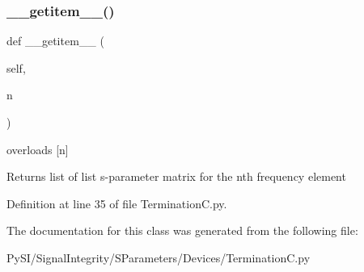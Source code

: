\subsubsection{\texorpdfstring{\+\_\+\+\_\+getitem\+\_\+\+\_\+()}{\_\_getitem\_\_()}}
{\footnotesize\ttfamily def \+\_\+\+\_\+getitem\+\_\+\+\_\+ (\begin{DoxyParamCaption}\item[{}]{self,  }\item[{}]{n }\end{DoxyParamCaption})}



overloads \mbox{[}n\mbox{]} 

\begin{DoxyReturn}{Returns}
list of list s-\/parameter matrix for the nth frequency element 
\end{DoxyReturn}


Definition at line 35 of file Termination\+C.\+py.



The documentation for this class was generated from the following file\+:\begin{DoxyCompactItemize}
\item 
Py\+S\+I/\+Signal\+Integrity/\+S\+Parameters/\+Devices/Termination\+C.\+py\end{DoxyCompactItemize}

